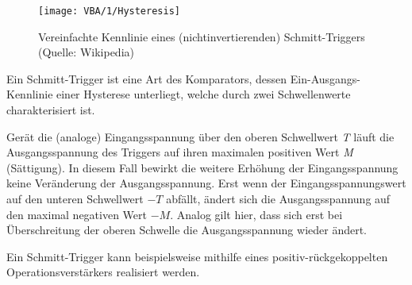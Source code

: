\begin{figure}[t]
  \begin{center}
    \texttt{[image: VBA/1/Hysteresis]}
  \end{center}
  \caption{Vereinfachte Kennlinie eines (nichtinvertierenden) Schmitt-Triggers (Quelle: Wikipedia)}
\end{figure}
Ein Schmitt-Trigger ist eine Art des Komparators, dessen Ein-Ausgangs-Kennlinie
einer Hysterese unterliegt, welche durch zwei Schwellenwerte charakterisiert ist.


Gerät die (analoge) Eingangsspannung über den oberen Schwellwert \textit{T} läuft die
Ausgangsspannung des Triggers auf ihren maximalen positiven Wert \textit{M} (Sättigung). In diesem
Fall bewirkt die weitere Erhöhung der Eingangsspannung keine Veränderung der
Ausgangsspannung. Erst wenn der Eingangsspannungswert auf den unteren
Schwellwert \textit{$-T$} abfällt, ändert sich die Ausgangsspannung auf den
maximal negativen Wert \textit{$-M$}. Analog gilt hier, dass sich erst bei
Überschreitung der oberen Schwelle die Ausgangsspannung wieder ändert. 

Ein Schmitt-Trigger kann beispielsweise mithilfe eines positiv-rückgekoppelten
Operationsverstärkers realisiert werden.
